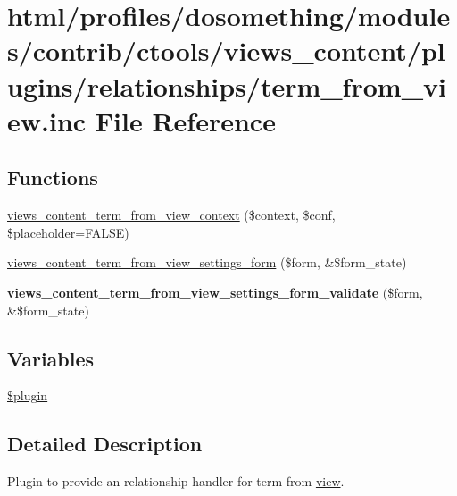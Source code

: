 \hypertarget{term__from__view_8inc}{
\section{html/profiles/dosomething/modules/contrib/ctools/views\_\-content/plugins/relationships/term\_\-from\_\-view.inc File Reference}
\label{term__from__view_8inc}
}
\subsection*{Functions}
\begin{DoxyCompactItemize}
\item 
\hyperlink{term__from__view_8inc_ae83e9aaa8c6fe1be354f6ba0ead74c89}{views\_\-content\_\-term\_\-from\_\-view\_\-context} (\$context, \$conf, \$placeholder=FALSE)
\item 
\hyperlink{term__from__view_8inc_a87dcdde935c61cb30183a170680e574f}{views\_\-content\_\-term\_\-from\_\-view\_\-settings\_\-form} (\$form, \&\$form\_\-state)
\item 
\hypertarget{term__from__view_8inc_a5602d5fd06c60500a77e2789c8aa7caa}{
{\bfseries views\_\-content\_\-term\_\-from\_\-view\_\-settings\_\-form\_\-validate} (\$form, \&\$form\_\-state)}
\label{term__from__view_8inc_a5602d5fd06c60500a77e2789c8aa7caa}

\end{DoxyCompactItemize}
\subsection*{Variables}
\begin{DoxyCompactItemize}
\item 
\hyperlink{term__from__view_8inc_ada8a7130088351710bb02ed622d6bf65}{\$plugin}
\end{DoxyCompactItemize}


\subsection{Detailed Description}
Plugin to provide an relationship handler for term from \hyperlink{classview}{view}. 

